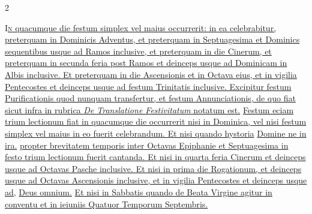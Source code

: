 \begin{multicols*}{2}

{\color{Red} }
\lettrine[lines=2]{\zallmancaps \color{Red} I}{}\ul{\textsc{n} quacumque die festum simplex vel maius occurrerit: in ea celebrabitur, preterquam in Dominicis Adventus, et preterquam in Septuagesima et Dominics sequentibus usque ad Ramos inclusive, et preterquam in die Cinerum, et preterquam in secunda feria post Ramos et deinceps usque ad Dominicam in Albis inclusive. Et preterquam in die Ascensionis et in Octava eius, et in vigilia Pentecostes et deinceps usque ad festum Trinitatis inclusive. Excipitur festum Purificationis quod nunquam transfertur, et festum Annunciationis, de quo fiat sicut infra in rubrica \textit{De Translatione Festivitatum} notatum est.}
\newline \ul{Festum eciam trium lectionum fiat in quacumque die occurrerit nisi in Dominica, vel nisi festum simplex vel maius in eo fuerit celebrandum. Et nisi quando hystoria} \hyperlink{domine-ne-in-ira}{Domine ne in ira.} \ul{propter brevitatem temporis inter Octavas Epiphanie et Septuagesima in festo trium lectionum fuerit cantanda. Et nisi in quarta feria Cinerum et deinceps usque ad Octavas Pasche inclusive. Et nisi in prima die Rogationum, et deinceps usque ad Octavas Ascensionis inclusive, et in vigilia Pentecostes et deinceps usque ad,} \hyperlink{deus-omnium}{Deus omnium.} \ul{Et nisi in Sabbatis quando de Beata Virgine agitur in conventu et in ieiuniis Quatuor Temporum Septembris.}


\end{multicols*}
